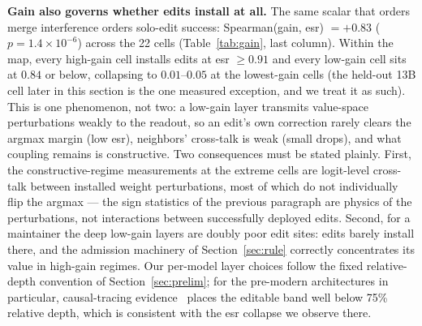 \documentclass[preprint,12pt]{elsarticle}
\theoremstyle{definition}
\begin{document}
\textbf{Gain also governs whether edits install at all.} The same scalar that orders
merge interference orders solo-edit success: Spearman(gain, esr) $=+0.83$
($p=1.4\times10^{-6}$) across the 22 cells (Table~\ref{tab:gain}, last column).
Within the map, every high-gain cell installs edits at esr $\geq0.91$ and every low-gain
cell sits at $0.84$ or below, collapsing to $0.01$--$0.05$ at the lowest-gain cells (the
held-out 13B cell later in this section is the one measured exception, and we treat it as
such). This is one
phenomenon, not two: a low-gain layer transmits value-space perturbations weakly to
the readout, so an edit's own correction rarely clears the argmax margin (low esr),
neighbors' cross-talk is weak (small drops), and what coupling remains is
constructive. Two consequences must be stated plainly. First, the constructive-regime
measurements at the extreme cells are logit-level cross-talk between installed weight
perturbations, most of which do not individually flip the argmax --- the sign
statistics of the previous paragraph are physics of the perturbations, not
interactions between successfully deployed edits. Second, for a maintainer the deep
low-gain layers are doubly poor edit sites: edits barely install there, and the
admission machinery of Section~\ref{sec:rule} correctly concentrates its value in
high-gain regimes. Our per-model layer choices follow the fixed relative-depth
convention of Section~\ref{sec:prelim}; for the pre-modern architectures in
particular, causal-tracing evidence~\cite{rome2022} places the editable band well
below 75\% relative depth, which is consistent with the esr collapse we observe
there.
\end{document}

